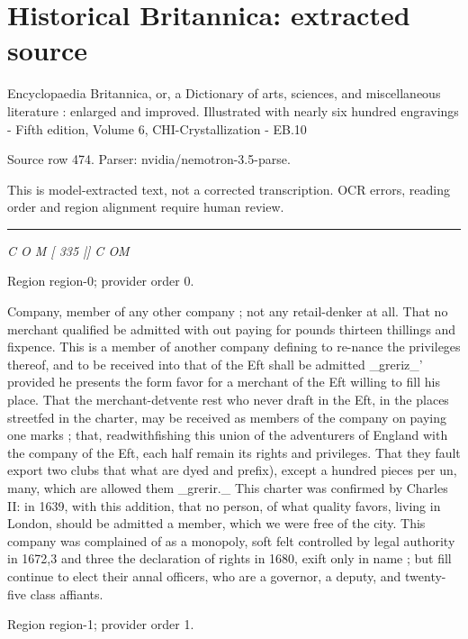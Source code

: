 \documentclass[11pt]{article}
\begin{document}
\section*{Historical Britannica: extracted source}
Encyclopaedia Britannica, or, a Dictionary of arts, sciences, and miscellaneous literature : enlarged and improved. Illustrated with nearly six hundred engravings - Fifth edition, Volume 6, CHI-Crystallization - EB.10\par
{\small Source row 474. Parser: nvidia/nemotron-3.5-parse.\par}
{\small This is model-extracted text, not a corrected transcription. OCR errors, reading order and region alignment require human review.\par}
\hrule\medskip
{\small\itshape C O M [ 335 |] C OM\par}

{\scriptsize\color{gray} Region region-0; provider order 0.\par}
\medskip

Company, member of any other company ; not any retail-denker at all. That no merchant qualified be admitted with out paying for pounds thirteen thillings and fixpence. This is a member of another company defining to re-nance the privileges thereof, and to be received into that of the Eft shall be admitted \_greriz\_’ provided he presents the form favor for a merchant of the Eft willing to fill his place. That the merchant-detvente rest who never draft in the Eft, in the places streetfed in the charter, may be received as members of the company on paying one marks ; that, readwithfishing this union of the adventurers of England with the company of the Eft, each half remain its rights and privileges. That they fault export two clubs that what are dyed and prefix), except a hundred pieces per un, many, which are allowed them \_grerir.\_ This charter was confirmed by Charles II: in 1639, with this addition, that no person, of what quality favors, living in London, should be admitted a member, which we were free of the city. This company was complained of as a monopoly, soft felt controlled by legal authority in 1672,3 and three the declaration of rights in 1680, exift only in name ; but fill continue to elect their annal officers, who are a governor, a deputy, and twenty-five class affiants.
\par

{\scriptsize\color{gray} Region region-1; provider order 1.\par}
\medskip
\end{document}
